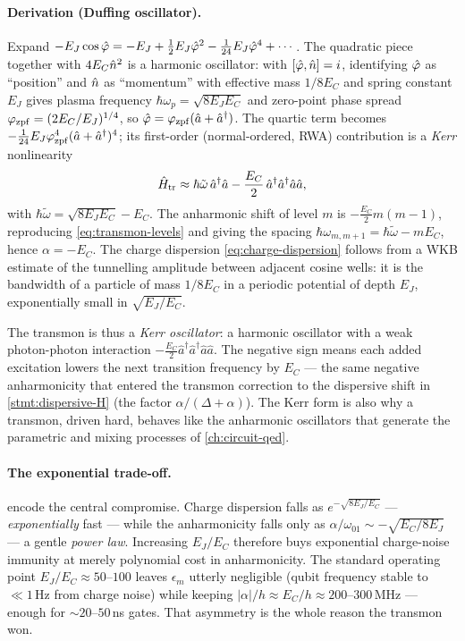 \paragraph{Derivation (Duffing oscillator).}
Expand $-E_J\cos\hat{\varphi}=-E_J+\tfrac12 E_J\hat{\varphi}^2
-\tfrac1{24}E_J\hat{\varphi}^4+\cdots$. The quadratic piece together with
$4E_C\hat{n}^2$ is a harmonic oscillator: with $\comm{\op\varphi}{\op n}=i$,
identifying $\hat{\varphi}$ as ``position'' and $\hat{n}$ as ``momentum''
with effective mass $1/8E_C$ and spring constant $E_J$ gives plasma
frequency $\hbar\omega_p=\sqrt{8E_JE_C}$ and zero-point phase spread
$\varphi_{\rm zpf}=(2E_C/E_J)^{1/4}$, so
$\hat{\varphi}=\varphi_{\rm zpf}(\hat a+\hat a^\dagger)$. The quartic term
becomes $-\tfrac{1}{24}E_J\varphi_{\rm zpf}^4(\hat a+\hat a^\dagger)^4$;
its first-order (normal-ordered, RWA) contribution is a \emph{Kerr}
nonlinearity
\begin{equation}
\label{eq:transmon-kerr}
\hat{H}_{\rm tr}\approx \hbar\tilde\omega\,\hat a^\dagger\hat a
  - \frac{E_C}{2}\,\hat a^\dagger\hat a^\dagger\hat a\hat a,
\end{equation}
with $\hbar\tilde\omega=\sqrt{8E_JE_C}-E_C$. The anharmonic shift of
level $m$ is $-\tfrac{E_C}{2}m(m-1)$, reproducing
\cref{eq:transmon-levels} and giving the spacing
$\hbar\omega_{m,m+1}=\hbar\tilde\omega-mE_C$, hence $\alpha=-E_C$. The
charge dispersion \cref{eq:charge-dispersion} follows from a WKB
estimate of the tunnelling amplitude between adjacent cosine wells: it
is the bandwidth of a particle of mass $1/8E_C$ in a periodic
potential of depth $E_J$, exponentially small in
$\sqrt{E_J/E_C}$.

\begin{remark}
The transmon is thus a \emph{Kerr oscillator}: a harmonic oscillator
with a weak photon-photon interaction $-\tfrac{E_C}{2}\hat a^\dagger\hat a^\dagger\hat a\hat a$.
The negative sign means each added excitation lowers the next
transition frequency by $E_C$ --- the same negative anharmonicity that
entered the transmon correction to the dispersive shift in
\cref{stmt:dispersive-H} (the factor $\alpha/(\Delta+\alpha)$). The
Kerr form is also why a transmon, driven hard, behaves like the
anharmonic oscillators that generate the parametric and mixing
processes of \cref{ch:circuit-qed}.
\end{remark}

\paragraph{The exponential trade-off.}
 encode the central
compromise. Charge dispersion falls as $e^{-\sqrt{8E_J/E_C}}$ ---
\emph{exponentially} fast --- while the anharmonicity falls only as
$\alpha/\omega_{01}\sim-\sqrt{E_C/8E_J}$ --- a gentle \emph{power law}.
Increasing $E_J/E_C$ therefore buys exponential charge-noise immunity
at merely polynomial cost in anharmonicity. The standard operating
point $E_J/E_C\approx50$--$100$ leaves $\epsilon_m$ utterly negligible
(qubit frequency stable to $\ll1\,$Hz from charge noise) while keeping
$|\alpha|/h\approx E_C/h\approx200$--$300\,$MHz --- enough for
$\sim20$--$50\,$ns gates. That asymmetry is the whole reason the
transmon won.

